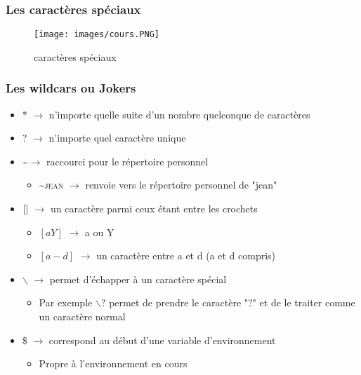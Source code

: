 \documentclass[a4paper]{article}
\begin{document}
    \subsubsection{Les caractères spéciaux}
    \begin{figure}[H]
    \centering
    \texttt{[image: images/cours.PNG]}
    \caption{caractères spéciaux}
    \end{figure}

    \subsubsection{Les wildcars ou Jokers}
    \begin{itemize}[label=\textbullet, font=\Large]
      \item * $\rightarrow$ n’importe quelle suite d’un nombre quelconque de caractères
      \item ? $\rightarrow$ n'importe quel caractère unique
      \item \textasciitilde \space $\rightarrow$ raccourci pour le répertoire personnel
      \begin{itemize}[label=, font=\scriptsize]
        \item \textsc{ \textasciitilde \space jean} $\rightarrow$ renvoie vers le répertoire personnel de "jean"
      \end{itemize}
      \item $\left\lbrack \space \space \right\rbrack$ $\rightarrow$ un caractère parmi ceux étant entre les crochets
      \begin{itemize}[label=, font=\scriptsize]
        \item $\left\lbrack aY \right\rbrack$ $\rightarrow$ a ou Y
        \item $\left\lbrack a-d \right\rbrack$ $\rightarrow$ un caractère entre a et d (a et d compris)
      \end{itemize}
      \item $\backslash$ $\rightarrow$ permet d'échapper à un caractère spécial
      \begin{itemize}[label=, font=\scriptsize]
        \item Par exemple \textsc{$\backslash$?} permet de prendre le caractère "?" et de le traiter comme un caractère normal
      \end{itemize}
      \item \$ $\rightarrow$ correspond au début d'une variable d'environnement
      \begin{itemize}[label=, font=\scriptsize]
        \item Propre à l'environnement en cours\\[0.2cm]
      \end{itemize}

    \end{itemize}
\end{document}
